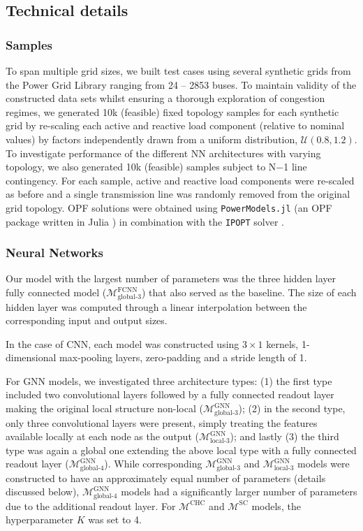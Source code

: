 \documentclass[journal]{IEEEtran}
\def\nmo{N$-$1}%
\begin{document}
\subsection{Technical details}
\subsubsection{Samples}
To span multiple grid sizes, we built test cases using several synthetic grids from the Power Grid Library \cite{Babaeinejadsarookolaee2019} ranging from 24 -- 2853 buses. To maintain validity of the constructed data sets whilst ensuring a thorough exploration of congestion regimes, we generated 10k (feasible) fixed topology samples for each synthetic grid by re-scaling each active and reactive load component (relative to nominal values) by factors independently drawn from a uniform distribution, $\mathcal{U}(0.8, 1.2)$. To investigate performance of the different NN architectures with varying topology, we also generated 10k (feasible) samples subject to \nmo{} line contingency. For each sample, active and reactive load components were re-scaled as before and a single transmission line was randomly removed from the original grid topology. OPF solutions were obtained using \texttt{PowerModels.jl} \cite{Coffrin2018} (an OPF package written in Julia \cite{Bezanson2012}) in combination with the \texttt{IPOPT} solver \cite{Wachter2006}.

\subsubsection{Neural Networks}
Our model with the largest number of parameters was the three hidden layer fully connected model ($\mathcal{M}^{\textrm{FCNN}}_{\textrm{global-3}}$) that also served as the baseline. The size of each hidden layer was computed through a linear interpolation between the corresponding input and output sizes. 

In the case of CNN, each model was constructed using \(3\times 1\) kernels, 1-dimensional max-pooling layers, zero-padding and a stride length of 1. 

For GNN models, we investigated three architecture types:
(1) the first type included two convolutional layers followed by a fully connected readout layer making the original local structure non-local ($\mathcal{M}^{\textrm{GNN}}_{\textrm{global-3}}$);
(2) in the second type, only three convolutional layers were present, simply treating the features available locally at each node as the output ($\mathcal{M}^{\textrm{GNN}}_{\textrm{local-3}}$); and lastly (3) the third type was again a global one extending the above local type with a fully connected readout layer ($\mathcal{M}^{\textrm{GNN}}_{\textrm{global-4}}$).
While corresponding $\mathcal{M}^{\textrm{GNN}}_{\textrm{global-3}}$ and $\mathcal{M}^{\textrm{GNN}}_{\textrm{local-3}}$ models were constructed to have an approximately equal number of parameters (details discussed below), $\mathcal{M}^{\textrm{GNN}}_{\textrm{global-4}}$ models had a significantly larger number of parameters due to the additional readout layer.
For $\mathcal{M}^{\textrm{CHC}}$ and $\mathcal{M}^{\textrm{SC}}$ models, the hyperparameter $K$ was set to 4.
\end{document}

